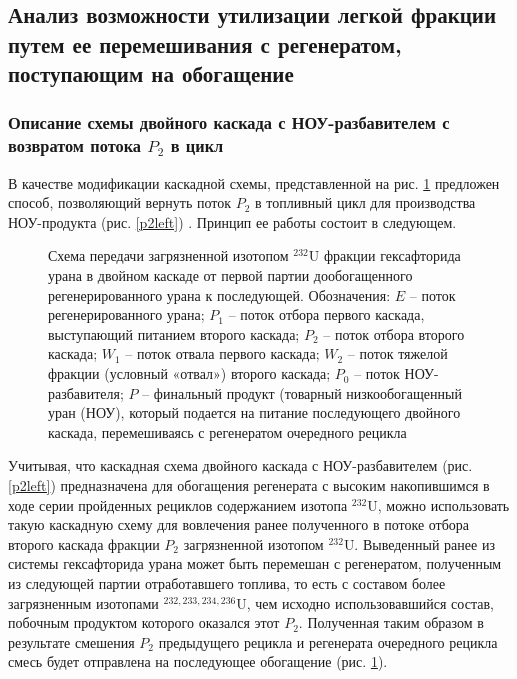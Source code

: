 \subsection{Анализ возможности утилизации легкой фракции путем ее перемешивания с регенератом, поступающим на обогащение}

\subsubsection{Описание схемы двойного каскада с НОУ-разбавителем с возвратом потока $P_2$ в цикл}

В качестве модификации каскадной схемы, представленной на рис. \ref{P2utilizationRing} предложен способ, позволяющий вернуть поток $P_2$ в топливный цикл для производства НОУ-продукта (рис. \ref{p2left}) \cite{nevinicaToplivnyyCiklLegkovodnogo2019, nevinicaSposobIzotopnogoVosstanovleniya2019}. Принцип ее работы состоит в следующем.

\begin{figure}[ht]
    \caption{Схема передачи загрязненной изотопом $^{232}$U фракции гексафторида урана в двойном каскаде от первой партии дообогащенного регенерированного урана к последующей. Обозначения: $E$ -- поток регенерированного урана; $P_1$ -- поток отбора первого каскада, выступающий питанием второго каскада; $P_2$ -- поток отбора второго каскада; $W_1$ -- поток отвала первого каскада; $W_2$ -- поток тяжелой фракции (условный «отвал») второго каскада; $P_0$ -- поток НОУ-разбавителя; $P$ -- финальный продукт (товарный низкообогащенный уран (НОУ), который подается на питание последующего двойного каскада, перемешиваясь с регенератом очередного рецикла}\label{P2utilizationRing}
\end{figure}

Учитывая, что каскадная схема двойного каскада с НОУ-разбавителем (рис. \ref{p2left}) предназначена для обогащения регенерата с высоким накопившимся в ходе серии пройденных рециклов содержанием изотопа $^{232}$U, можно использовать такую каскадную схему для вовлечения ранее полученного в потоке отбора второго каскада фракции $P_2$ загрязненной изотопом $^{232}$U. Выведенный ранее из системы гексафторида урана может быть перемешан с регенератом, полученным из следующей партии отработавшего топлива, то есть с составом более загрязненным изотопами $^{232,233,234,236}$U, чем исходно использовавшийся состав, побочным продуктом которого оказался этот $P_2$. Полученная таким образом в результате смешения $P_2$ предыдущего рецикла и регенерата очередного рецикла смесь будет отправлена на последующее обогащение (рис. \ref{P2utilizationRing}).

